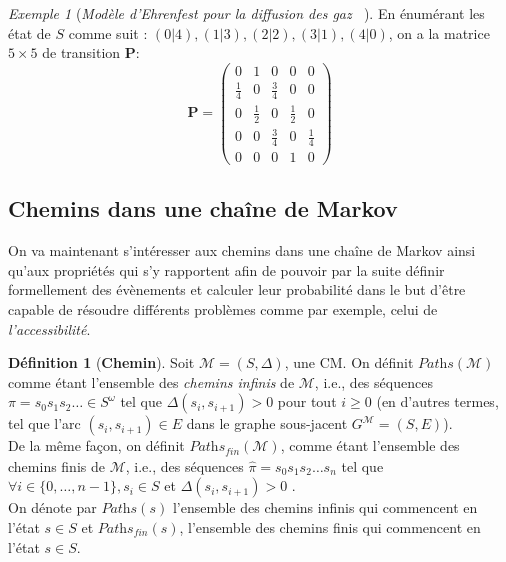 \documentclass[12pt,a4paper]{report}
\theoremstyle{definition}%
\newtheorem{definition}{Définition}[chapter]
\theoremstyle{remark}
\newtheorem{example}{Exemple}[chapter]
\newcommand{\ie}{i.e., }
\begin{document}
\begin{example}[\textit{Modèle d'Ehrenfest pour la diffusion des gaz ~\cite{Course3}}]
	En énumérant les état de $S$ comme suit : $(0|4), (1|3), (2|2), (3|1), (4|0)$, on a la matrice $5\times5$ de transition $\textbf{P}$:
	\[
		\textbf{P} =
			\begin{pmatrix}
			0 & 1 & 0 & 0 & 0 \\
			\frac{1}{4} & 0 & \frac{3}{4}& 0 & 0 \\
			0 & \frac{1}{2} & 0 & \frac{1}{2} & 0 \\
			0 & 0 & \frac{3}{4} & 0 & \frac{1}{4} \\
			0 & 0 & 0 & 1 & 0
			\end{pmatrix}
	\]
\end{example}

\subsection*{Chemins dans une chaîne de Markov}
On va maintenant s'intéresser aux chemins dans une chaîne de Markov ainsi qu'aux propriétés qui s'y rapportent afin de pouvoir par la suite définir formellement des évènements et calculer leur probabilité dans le but d'être capable de résoudre différents problèmes comme par exemple, celui de \textit{l'accessibilité}.

\begin{definition}[\textbf{Chemin}]
	Soit $\mathcal{M} = (S, \Delta)$, une CM. 
	On définit $\textit{Paths}(\mathcal{M})$ comme étant l'ensemble des \textit{chemins infinis} de $\mathcal{M}$, \ie des séquences $\pi = s_0 s_1 s_2 \dots \in S^\omega$ tel que $\Delta(s_i, s_{i+1}) > 0$ pour tout $i \geq 0$ (en d'autres termes, tel que l'arc $(s_i, s_{i+1}) \in E$ dans le graphe sous-jacent $G^\mathcal{M} = (S, E)$).\\
	De la même façon, on définit $\textit{Paths}_\textit{fin}(\mathcal{M})$, comme étant l'ensemble des chemins finis de $\mathcal{M}$, \ie des séquences $\hat{\pi} = s_0 s_1 s_2 \dots s_n$ tel que $\forall i \in \{0, \dots, n-1\}, s_i \in S$ et $\Delta(s_i, s_{i+1}) > 0$ .\\
	On dénote par $\textit{Paths}(s)$ l'ensemble des chemins infinis qui commencent en l'état $s \in S$ et $\textit{Paths}_\textit{fin}(s)$, l'ensemble des chemins finis qui commencent en l'état $s \in S$.
\end{definition}
\end{document}
